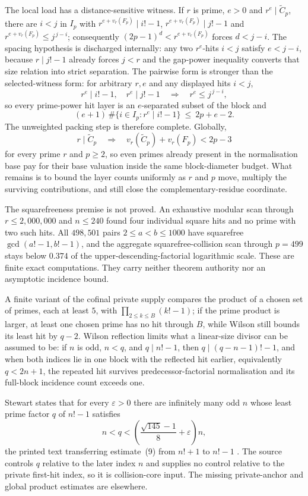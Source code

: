 The local load has a distance-sensitive witness.  If $r$ is prime, $e>0$ and
$r^e\mid\widetilde C_p$, there are $i<j$ in $I_p$ with
$r^{e+v_r(F_p)}\mid i!-1$, $r^{e+v_r(F_p)}\mid j!-1$ and
$r^{e+v_r(F_p)}\le j^{\,j-i}$; consequently $(2p-1)^d<r^{e+v_r(F_p)}$ forces
$d<j-i$.  The spacing hypothesis is discharged internally: any two $r^e$-hits
$i<j$ satisfy $e<j-i$, because $r\mid j!-1$ already forces $j<r$ and the
gap-power inequality converts that size relation into strict separation.  The
pairwise form is stronger than the selected-witness form: for arbitrary $r,e$
and any displayed hits $i<j$,
\[
 r^e\mid i!-1,\quad r^e\mid j!-1
 \quad\Longrightarrow\quad r^e\le j^{\,j-i},
\]
so every prime-power hit layer is an $e$-separated subset of the block and
\[
 (e+1)\,\#\{i\in I_p:r^e\mid i!-1\}\ \le\ 2p+e-2 .
\]
The unweighted packing step is therefore complete.  Globally,
\[
 r\mid\widetilde C_p
 \quad\Longrightarrow\quad
 v_r(\widetilde C_p)+v_r(F_p)<2p-3
\]
for every prime $r$ and $p\ge2$, so even primes already present in the
normalisation base pay for their base valuation inside the same
block-diameter budget.  What remains is to bound the layer counts uniformly
as $r$ and $p$ move, multiply the surviving contributions, and still close
the complementary-residue coordinate.

The squarefreeness premise is not proved.  An exhaustive modular scan through
$r\le2{,}000{,}000$ and $n\le240$ found four individual square hits and no
prime with two such hits.  All $498{,}501$ pairs $2\le a<b\le1000$ have
squarefree $\gcd(a!-1,b!-1)$, and the aggregate squarefree-collision scan
through $p=499$ stays below $0.374$ of the upper-descending-factorial
logarithmic scale.  These are finite exact computations.  They carry neither theorem authority
nor an asymptotic incidence bound.

A finite variant of the cofinal private supply compares the product of a
chosen set of primes, each at least $5$, with $\prod_{2\le k\le B}(k!-1)$; if
the prime product is larger, at least one chosen prime has no hit through
$B$, while Wilson still bounds its least hit by $q-2$.  Wilson reflection
limits what a linear-size divisor can be assumed to be: if $n$ is odd,
$n<q$, and $q\mid n!-1$, then $q\mid(q-n-1)!-1$, and when both indices lie in
one block with the reflected hit earlier, equivalently $q<2n+1$, the repeated
hit survives predecessor-factorial normalisation and its full-block incidence
count exceeds one.

Stewart states that for every $\varepsilon>0$ there are infinitely many odd
$n$ whose least prime factor $q$ of $n!-1$ satisfies
\[
 n<q<\left(\frac{\sqrt{145}-1}{8}+\varepsilon\right)n ,
\]
the printed text transferring estimate~(9) from $n!+1$ to $n!-1$
\cite[p.~464]{stewart2004}.  The source controls $q$ relative to the later
index $n$ and supplies no control relative to the private first-hit index,
so it is collision-core input.  The missing private-anchor and global product
estimates are elsewhere.


